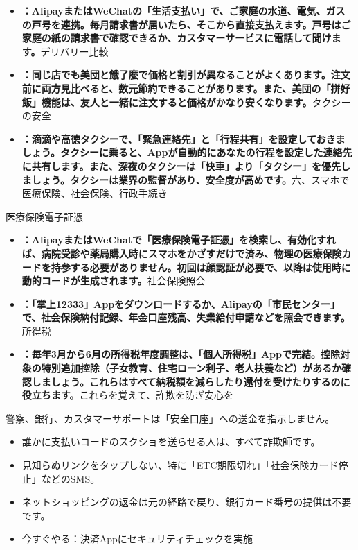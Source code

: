 \begin{itemize}
  \item \textbf{：AlipayまたはWeChatの「生活支払い」で、ご家庭の水道、電気、ガスの戸号を連携。毎月請求書が届いたら、そこから直接支払えます。戸号はご家庭の紙の請求書で確認できるか、カスタマーサービスに電話して聞けます。}デリバリー比較
  \item \textbf{：同じ店でも美団と餓了麼で価格と割引が異なることがよくあります。注文前に両方見比べると、数元節約できることがあります。また、美団の「拼好飯」機能は、友人と一緒に注文すると価格がかなり安くなります。}タクシーの安全
  \item \textbf{：滴滴や高徳タクシーで、「緊急連絡先」と「行程共有」を設定しておきましょう。タクシーに乗ると、Appが自動的にあなたの行程を設定した連絡先に共有します。また、深夜のタクシーは「快車」より「タクシー」を優先しましょう。タクシーは業界の監督があり、安全度が高めです。}六、スマホで医療保険、社会保険、行政手続き
\end{itemize}


医療保険電子証憑

\begin{itemize}
  \item \textbf{：AlipayまたはWeChatで「医療保険電子証憑」を検索し、有効化すれば、病院受診や薬局購入時にスマホをかざすだけで済み、物理の医療保険カードを持参する必要がありません。初回は顔認証が必要で、以降は使用時に動的コードが生成されます。}社会保険照会
  \item \textbf{：「掌上12333」Appをダウンロードするか、Alipayの「市民センター」で、社会保険納付記録、年金口座残高、失業給付申請などを照会できます。}所得税
  \item \textbf{：毎年3月から6月の所得税年度調整は、「個人所得税」Appで完結。控除対象の特別追加控除（子女教育、住宅ローン利子、老人扶養など）があるか確認しましょう。これらはすべて納税額を減らしたり還付を受けたりするのに役立ちます。}これらを覚えて、詐欺を防ぎ安心を
\end{itemize}

\begin{tcbwarn}{警察、銀行、カスタマーサポートは「安全口座」への送金を指示しません。}
\begin{itemize}
  \item 誰かに支払いコードのスクショを送らせる人は、すべて詐欺師です。
  \item 見知らぬリンクをタップしない、特に「ETC期限切れ」「社会保険カード停止」などのSMS。
  \item ネットショッピングの返金は元の経路で戻り、銀行カード番号の提供は不要です。
  \item 今すぐやる：決済Appにセキュリティチェックを実施
\end{itemize}

\end{tcbwarn}

